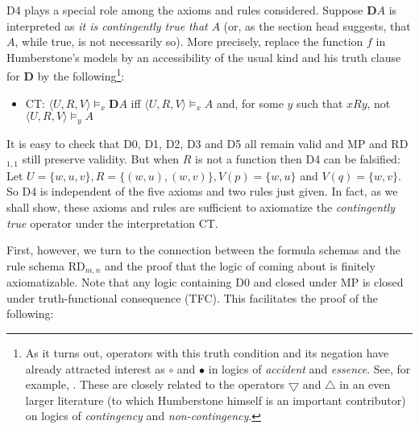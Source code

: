 D4 plays a special role among the axioms and rules considered. Suppose $\mathbf{D}{A}$ is interpreted as \textit{it is contingently true that} $A$ (or, as the section head suggests, that $A$, while true, is not necessarily so). More precisely, replace the function $f$ in Humberstone's models by an accessibility of the usual kind and his truth clause for $\mathbf{D}$ by the following\footnote{As it turns out, operators with this truth condition and its negation have already attracted interest as $\circ$ and $\bullet$ in logics of \textit{accident} and \textit{essence}. See, for example, \citet{marcos.2005, steinsvold.2008, fan.2015}. These are closely related to the operators $\bigtriangledown$ and $\bigtriangleup$ in an even larger literature (to which Humberstone himself is an important contributor) on logics of \textit{contingency} and \textit{non-contingency}.}:
\begin{itemize}[label={}]
\item{
CT: $\langle U,R,V\!\rangle  \models _x \mathbf{D}A$ iff $\langle U,R,V\!\rangle  \models _x A$ and, for some $y$ such that $xRy$, not $\langle U,R,V\!\rangle \models _y A$
}
\end{itemize}
It is easy to check that D0, D1, D2, D3 and D5 all remain valid and MP and RD$_{1,1}$ still preserve validity. But when $R$ is not a function then D4 can be falsified: Let $U=\{w,u,v\}, R=\{(w,u),(w,v)\}, V(p)=\{w,u\}$ and $V(q)=\{w,v\}$. So D4 is independent of the five axioms and two rules just given. In fact, as we shall show, these axioms and rules are sufficient to axiomatize the \textit{contingently true} operator under the interpretation CT. 

First, however, we turn to the connection between the formula schemas and the rule schema RD$_{m,n}$ and the proof that the logic of coming about is finitely axiomatizable. Note that any logic containing D0 and closed under MP is closed under truth-functional consequence (TFC). This facilitates the proof of the following:

